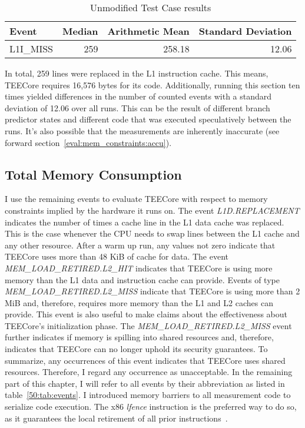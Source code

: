 \begin{table}[ht]
  \centering
  \begin{tabular}{ |l||r|r|r| }
    \hline
    Event            & Median & Arithmetic Mean & Standard Deviation \\
    \hline
    L1I\_MISS        & 259    & 258.18          & 12.06\\
    \hline
  \end{tabular}
  \caption{Unmodified Test Case results}
  \label{50:tab:code_size}
\end{table}

In total, 259 lines were replaced in the L1 instruction cache. This means,
TEECore requires 16,576 bytes for its code. Additionally, running this section
ten times yielded differences in the number of counted events with a standard
deviation of 12.06 over all runs. This can be the result of different branch
predictor states and different code that was executed speculatively between the
runs. It's also possible that the measurements are inherently inaccurate (see
forward section~\ref{eval:mem_constraints:accu}).

\subsection{Total Memory Consumption}
I use the remaining events to evaluate TEECore with respect to memory constraints
implied by the hardware it runs on. The event \textit{L1D.REPLACEMENT} indicates
the number of times a cache line in the L1 data cache was replaced. This is the
case whenever the CPU needs to swap lines between the L1 cache and any other
resource. After a warm up run, any values not zero indicate that TEECore uses
more than 48 KiB of cache for data. The event
\textit{MEM\_LOAD\_RETIRED.L2\_HIT} indicates that TEECore is using more memory
than the L1 data and instruction cache can provide. Events of type
\textit{MEM\_LOAD\_RETIRED.L2\_MISS} indicate that TEECore is using more than 2
MiB and, therefore, requires more memory than the L1 and L2 caches can provide.
This event is also useful to make claims about the effectiveness about TEECore's
initialization phase. The \textit{MEM\_LOAD\_RETIRED.L2\_MISS} event further
indicates if memory is spilling into shared resources and, therefore, indicates
that TEECore can no longer uphold its security guarantees. To summarize, any
occurrences of this event indicates that TEECore uses shared resources.
Therefore, I regard any occurrence as unacceptable. In the remaining part of
this chapter, I will refer to all events by their abbreviation as listed in
table~\ref{50:tab:events}. I introduced memory barriers to all measurement code
to serialize code execution. The x86 \textit{lfence} instruction is the
preferred way to do so, as it guarantees the local retirement of all prior
instructions~\cite{mccalpin2018comments, intel_sdm}.

